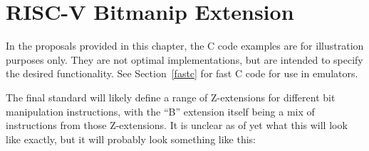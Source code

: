 \chapter{RISC-V Bitmanip Extension}
\label{bext}

In the proposals provided in this chapter, the C code examples are for
illustration purposes only. They are not optimal implementations, but are
intended to specify the desired functionality. See Section~\ref{fastc} for fast
C code for use in emulators.

The final standard will likely define a range of Z-extensions for different bit
manipulation instructions, with the ``B'' extension itself being a mix of
instructions from those Z-extensions. It is unclear as of yet what this will
look like exactly, but it will probably look something like this:

